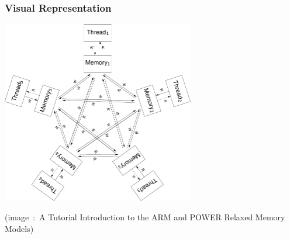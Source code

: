 \documentclass[xcolor={x11names,svgnames},x11names,svgnames]{beamer}
\begin{document}
\begin{frame}[label=pram]
  \frametitle{Visual Representation}
  
  \centering
  \includegraphics[height=8cm]{pram_archi.pdf}
    \medskip
  
  \scriptsize (image~:~A Tutorial
    Introduction to the ARM and POWER Relaxed Memory Models)

\end{frame}

\end{document}
